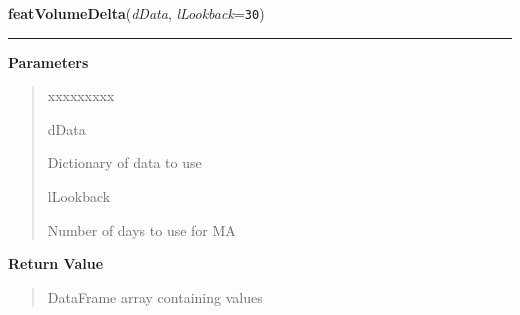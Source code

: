 \hspace{.8\funcindent}\begin{boxedminipage}{\funcwidth}

    \raggedright \textbf{featVolumeDelta}(\textit{dData}, \textit{lLookback}={\tt 30})

    \vspace{-1.5ex}

    \rule{\textwidth}{0.5\fboxrule}
\setlength{\parskip}{2ex}
\setlength{\parskip}{1ex}
      \textbf{Parameters}
      \vspace{-1ex}

      \begin{quote}
        \begin{Ventry}{xxxxxxxxx}

          \item[dData]

          Dictionary of data to use

          \item[lLookback]

          Number of days to use for MA

        \end{Ventry}

      \end{quote}

      \textbf{Return Value}
    \vspace{-1ex}

      \begin{quote}
      DataFrame array containing values

      \end{quote}

    \end{boxedminipage}

    \label{QSTK:qstkfeat:features:featAroon}

    \vspace{0.5ex}


